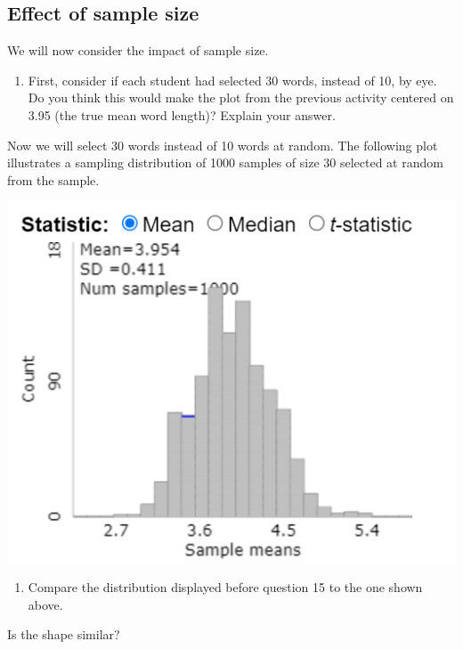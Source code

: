 \documentclass[
]{report}
\providecommand{\tightlist}{%
  \setlength{\itemsep}{0pt}\setlength{\parskip}{0pt}}
\newcommand{\rgi}{\hspace{24pt}}  %
\begin{document}
\subsection*{Effect of sample size}\label{effect-of-sample-size}

We will now consider the impact of sample size.

\begin{enumerate}
\def\labelenumi{\arabic{enumi}.}
\setcounter{enumi}{17}
\tightlist
\item
  First, consider if each student had selected 30 words, instead of 10, by eye. Do you think this would make the plot from the previous activity centered on 3.95 (the true mean word length)? Explain your answer.
  \vspace{0.4in}
\end{enumerate}

\newpage

Now we will select 30 words instead of 10 words at random. The following plot illustrates a sampling distribution of 1000 samples of size 30 selected at random from the sample.

\begin{center}\includegraphics[width=0.75\linewidth]{images/bencenti_sampling30} \end{center}

\begin{enumerate}
\def\labelenumi{\arabic{enumi}.}
\setcounter{enumi}{18}
\tightlist
\item
  Compare the distribution displayed before question 15 to the one shown above.
\end{enumerate}

\rgi Is the shape similar?\\
\vspace{0.2in}
\end{document}
